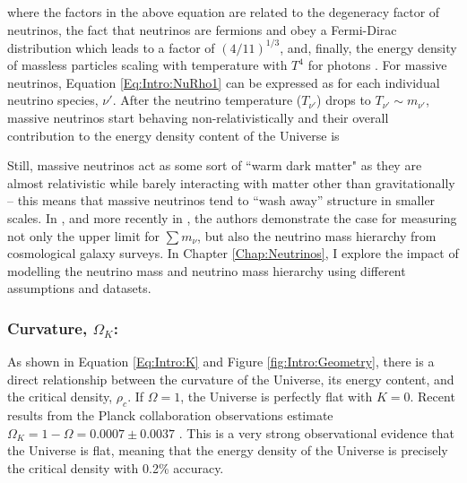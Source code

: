 where the factors in the above equation are related to the degeneracy factor of neutrinos, the fact that neutrinos are fermions and obey a Fermi-Dirac distribution which leads to a factor of $(4/11)^{1/3}$, and, finally, the energy density of massless particles scaling with temperature with $T^{4}$ for photons \citep{dods}. For massive neutrinos, Equation \eqref{Eq:Intro:NuRho1} can be expressed as 
for each individual neutrino species, $\nu'$. After the neutrino temperature ($T_{\nu'}$) drops to $T_{\nu'} \sim  m_{\nu'}$, massive neutrinos start behaving non-relativistically and their overall contribution to the energy density content of the Universe is \citep{2003HannestadNeutrino}



\qquad Still, massive neutrinos act as some sort of ``warm dark matter" as they are almost relativistic while barely interacting with matter other than gravitationally -- this means that massive neutrinos tend to ``wash away'' structure in smaller scales. In \cite{2003HannestadNeutrino}, and more recently in \cite{2016JCAP...11..035H}, the authors demonstrate the case for measuring not only the upper limit for $\sum m_{\nu}$, but also the neutrino mass hierarchy from cosmological galaxy surveys. In Chapter \ref{Chap:Neutrinos}, I explore the impact of modelling the neutrino mass and neutrino mass hierarchy using different assumptions and datasets.


\subsubsection{Curvature, $\Omega_K$:}
As shown in Equation \eqref{Eq:Intro:K} and Figure \ref{fig:Intro:Geometry}, there is a direct relationship between the curvature of the Universe, its energy content, and the critical density, $\rho_c$. If $\Omega = 1$, the Universe is perfectly flat with $K=0$. Recent results from the Planck collaboration observations estimate $\Omega_K = 1 - \Omega = 0.0007\pm 0.0037$ \citep{2018PlanckCosmology}. This is a very strong observational evidence that the Universe is flat, meaning that the energy density of the Universe is precisely the critical density with 0.2\% accuracy. 

\vspace{5mm}

